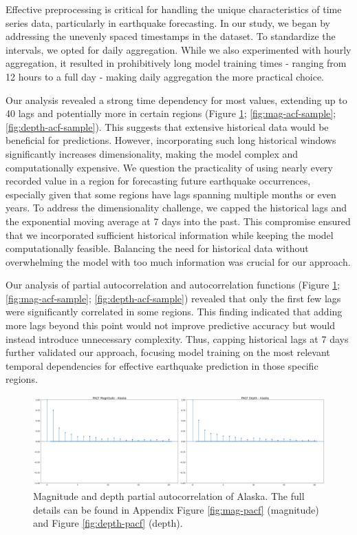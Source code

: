 Effective preprocessing is critical for handling the unique characteristics of
time series data, particularly in earthquake forecasting. In our study, we began
by addressing the unevenly spaced timestamps in the dataset. To standardize the
intervals, we opted for daily aggregation. While we also experimented with hourly
aggregation, it resulted in prohibitively long model training times - ranging
from 12 hours to a full day - making daily aggregation the more practical choice.

Our analysis revealed a strong time dependency for most values, extending up to
40 lags and potentially more in certain regions (Figure \ref{fig:pacf-sample};
\ref{fig:mag-acf-sample}; \ref{fig:depth-acf-sample}). This suggests that extensive
historical data would be beneficial for predictions. However, incorporating
such long historical windows significantly increases dimensionality, making
the model complex and computationally expensive. We question the practicality
of using nearly every recorded value in a region for forecasting future earthquake
occurrences, especially given that some regions have lags spanning multiple months or even years.
To address the dimensionality challenge, we capped the historical lags and the
exponential moving average at 7 days into the past. This compromise ensured that
we incorporated sufficient historical information while keeping the model
computationally feasible. Balancing the need for historical data without
overwhelming the model with too much information was crucial for our approach.

Our analysis of partial autocorrelation and autocorrelation functions
(Figure \ref{fig:pacf-sample};
\ref{fig:mag-acf-sample}; \ref{fig:depth-acf-sample}) revealed
that only the first few lags were significantly correlated in some regions.
This finding indicated that adding more lags beyond this point would not
improve predictive accuracy but would instead introduce unnecessary complexity.
Thus, capping historical lags at 7 days further validated our approach, focusing
model training on the most relevant temporal dependencies for effective earthquake
prediction in those specific regions.

\begin{figure}[hbtp]
  \centering
  \includegraphics[scale=0.2]{img/pacf-sample.png}
  \captionsetup{format=hang}
  \caption{\label{fig:pacf-sample}Magnitude and depth partial autocorrelation of Alaska.
    The full details can be found in Appendix Figure \ref{fig:mag-pacf} (magnitude)
    and Figure \ref{fig:depth-pacf} (depth).}
\end{figure}

